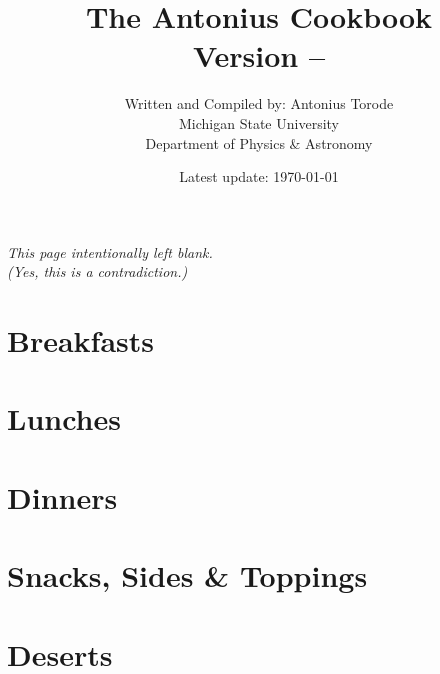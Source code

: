 \documentclass[a4paper,11pt]{book}
\title{{\huge \textbf{The Antonius Cookbook} \\ \textbf{Version -- \Version}} \\ \vspace{1cm}
}
\author{Written and Compiled by: Antonius Torode \\ Michigan State University \\ Department of Physics \& Astronomy}
\date{Latest update: \today}
\begin{document}
	
\AddToShipoutPicture*{\ChickenSalad}

\frontmatter
\clearpage
\maketitle

\tableofcontents
\newpage
\vspace*{\fill}
\begin{center}
	\textit{This page intentionally left blank. \\ (Yes, this is a contradiction.)}
\end{center}
\vspace*{\fill}

\mainmatter
\pagestyle{fancy}
\chapter{Breakfasts}

%
%

\chapter{Lunches}






\chapter{Dinners}






\chapter{Snacks, Sides \& Toppings}






\chapter{Deserts}






\backmatter
\end{document}
